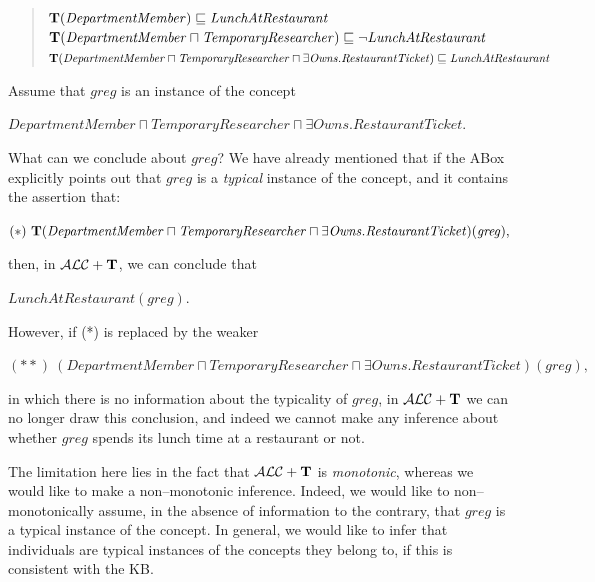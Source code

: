 \documentclass[a4paper, 11pt, oneside]{duthesis}
\newcommand{\tip}{{\bf T}}
\newcommand{\alct}{\mathcal{ALC}+\tip}
\newcommand{\nott} {\lnot}
\newcommand{\sqset}{\sqsubseteq}
\newcommand{\mint}{\sqcap}
\begin{document}
\begin{quote}
$\tip (\mathit{DepartmentMember}) \sqset \mathit{LunchAtRestaurant}$\\
$\tip (\mathit{DepartmentMember} \mint \mathit{TemporaryResearcher})  \sqset \nott \mathit{LunchAtRestaurant}$\\
$\tip (\mathit{DepartmentMember} \mint \mathit{TemporaryResearcher} \mint \exists \mathit{Owns}.\mathit{RestaurantTicket}) \sqset \mathit{LunchAtRestaurant}$
\end{quote}

\noindent Assume that $\mathit{greg}$ is an instance of the concept
\begin{center}$\mathit{DepartmentMember} \sqcap \mathit{TemporaryResearcher} \sqcap \exists \mathit{Owns}.\mathit{RestaurantTicket}$. \end{center}
What can we conclude about $\mathit{\mathit{greg}}$? We have already mentioned that if the ABox explicitly points out that $\mathit{greg}$ is a {\em typical} instance of the  concept, and it contains the assertion that:

\begin{center}$(*)  \ \tip(\mathit{DepartmentMember} \sqcap \mathit{TemporaryResearcher} \sqcap \exists \mathit{Owns}.\mathit{RestaurantTicket})(\mathit{greg}),$\end{center}


\noindent then, in $\alct$, we can conclude that

\begin{center}$\mathit{LunchAtRestaurant(\mathit{greg})}.$\end{center}

\noindent However, if (*) is replaced by the weaker
\begin{center} $(**)  \ (\mathit{DepartmentMember} \sqcap \mathit{TemporaryResearcher} \sqcap \exists \mathit{Owns}.\mathit{RestaurantTicket})(\mathit{greg}),$ \end{center}

in which there is no information about the typicality of $\mathit{greg}$, in $\alct$ we can no longer draw this conclusion, and indeed we cannot make any inference about whether $\mathit{greg}$ spends its lunch time at a restaurant or not.

The limitation here lies in the fact that $\alct$ is {\em monotonic}, whereas we would like to make a non--monotonic inference.
Indeed, we would like to non--monotonically assume, in the absence of information to the contrary, that $\mathit{greg}$ is a typical instance of the concept.
In general, we would like to infer that individuals are typical instances of the concepts they belong to, if this is consistent with the KB.
\end{document}
